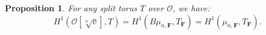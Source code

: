 \documentclass{proc-l}
\newcommand{\K}{\mathbf{K}}
\newcommand{\N}{\mathbf{N}}
\newcommand{\F}{\mathbf{F}}
\DeclareMathOperator{\Spec}{Spec}
\newcommand{\sheafO}{\mathcal{O}}
\newtheorem{prop}[theorem]{Proposition}
\theoremstyle{definition}
\theoremstyle{remark}
\numberwithin{equation}{section}
\begin{document}
\begin{prop}\label{proposition_cohomology_local_root_stack}
    For any split torus $T$ over $\sheafO$, we have:
    $$H^1(\sheafO[\sqrt[n]{v}],T) = H^1(B \mu_{n,\F} , T_{\F }) = H^1(\mu_{n,\F},T_{\F}) .$$
\end{prop}







%
\end{document}
